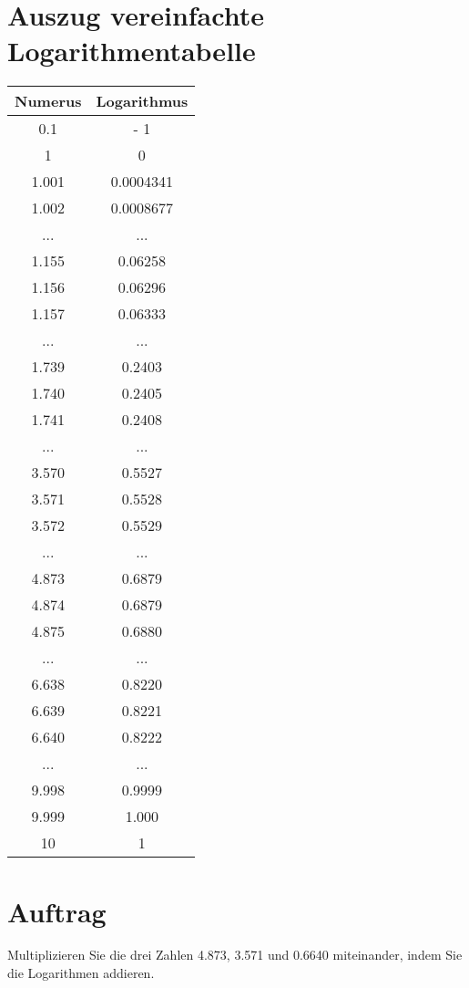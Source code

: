 




\renewcommand{\metaHeaderLine}{Logarithmen}
\renewcommand{\arbeitsblattTitel}{Multiplikation durch Addition}

\arbeitsblattHeader{}

\section*{Auszug vereinfachte Logarithmentabelle}

\begin{tabular}{|c|c|}\hline
Numerus & Logarithmus\\\hline
0.1   & - 1      \\\hline
1     & 0        \\\hline
1.001 & 0.0004341\\
1.002 & 0.0008677\\
...   & ...      \\
1.155 & 0.06258  \\
1.156 & 0.06296  \\
1.157 & 0.06333  \\
...   & ...      \\
1.739 & 0.2403   \\
1.740 & 0.2405   \\
1.741 & 0.2408   \\
...   & ...      \\
3.570 & 0.5527   \\
3.571 & 0.5528   \\
3.572 & 0.5529   \\
...   & ...      \\
4.873 & 0.6879   \\
4.874 & 0.6879   \\
4.875 & 0.6880   \\
...   & ...      \\
6.638 & 0.8220   \\
6.639 & 0.8221   \\
6.640 & 0.8222   \\
...   & ...      \\
9.998 & 0.9999   \\
9.999 & 1.000    \\\hline
10    & 1        \\\hline
\end{tabular}
 
\section*{Auftrag}
Multiplizieren Sie die drei Zahlen 4.873, 3.571 und 0.6640
miteinander, indem Sie die Logarithmen addieren.


